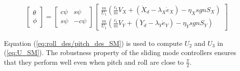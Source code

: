 \documentclass[journal,11pt,onecolumn,draftclsnofoot,]{IEEEtran}
\begin{document}


\begin{equation}
\label{eq:roll_des/pitch_des_SM}
\begin{split}
\begin{bmatrix}
\theta\\ 
\phi
\end{bmatrix}
=
\begin{bmatrix}
c\psi & s\psi \\ 
s\psi & -c\psi
\end{bmatrix}
\begin{bmatrix}
\frac{m}{U_1} \left( \frac{c_t}{m}V_X + \left( \ddot{X}_d - \lambda_X \dot{e}_X\right) - \eta_X sgn S_X \right)\\
\frac{m}{U_1} \left( \frac{c_t}{m}V_Y + \left( \ddot{Y}_d - \lambda_Y \dot{e}_Y \right) - \eta_Y sgn S_Y \right)
\end{bmatrix}
\end{split}
\end{equation}

Equation (\ref{eq:roll_des/pitch_des_SM}) is used to compute $U_2$ and $U_3$ in (\ref{eq:U_SM}).  The robustness property of the sliding mode controllers ensures that they perform well even when pitch and roll are close to $\frac{\pi}{2}$.
\end{document}
